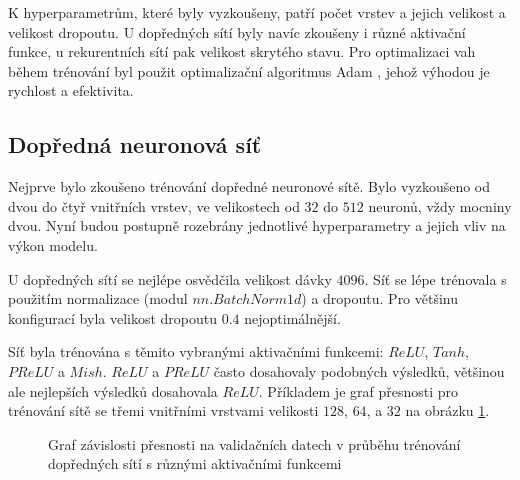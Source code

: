 K hyperparametrům, které byly vyzkoušeny, patří počet vrstev a jejich velikost
a velikost dropoutu. U dopředných sítí byly navíc zkoušeny i různé aktivační
funkce, u rekurentních sítí pak velikost skrytého stavu. Pro optimalizaci vah
během trénování byl použit optimalizační algoritmus Adam \cite{adam}, jehož
výhodou je rychlost a efektivita.

\subsection{Dopředná neuronová síť}

Nejprve bylo zkoušeno trénování dopředné neuronové sítě. Bylo vyzkoušeno od
dvou do čtyř vnitřních vrstev, ve velikostech od $32$ do $512$ neuronů, vždy
mocniny dvou. Nyní budou postupně rozebrány jednotlivé hyperparametry a jejich
vliv na výkon modelu.

U dopředných sítí se nejlépe osvědčila velikost dávky $4096$. Síť se lépe
trénovala s použitím normalizace (modul $nn.BatchNorm1d$) a dropoutu. Pro
většinu konfigurací byla velikost dropoutu $0.4$ nejoptimálnější.

Síť byla trénována s těmito vybranými aktivačními funkcemi: $ReLU$, $Tanh$,
$PReLU$ a $Mish$. $ReLU$ a $PReLU$ často dosahovaly podobných výsledků,
většinou ale nejlepších výsledků dosahovala $ReLU$. Příkladem je graf přesnosti
pro trénování sítě se třemi vnitřními vrstvami velikosti $128$, $64$, a $32$ na
obrázku \ref{graph:fnnactivations}.

\begin{figure}[]
    \centering
    \caption{Graf závislosti přesnosti na validačních datech v průběhu trénování dopředných sítí s různými aktivačními funkcemi}
    \label{graph:fnnactivations}
\end{figure}


